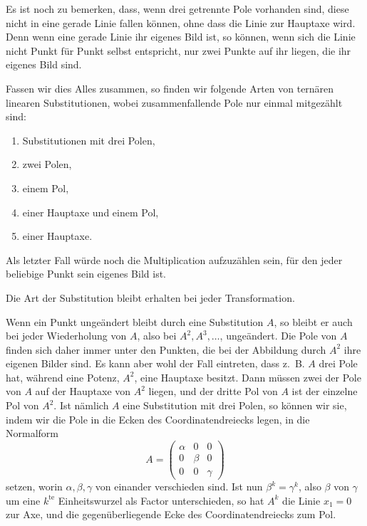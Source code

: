 \documentclass[12pt,a4paper]{article}
\begin{document}
Es ist noch zu bemerken, dass, wenn drei getrennte Pole vorhanden sind, diese nicht in eine gerade Linie fallen k\"onnen, ohne dass die Linie zur Hauptaxe wird. Denn wenn eine gerade Linie ihr eigenes Bild ist, so k\"onnen, wenn sich die Linie nicht Punkt f\"ur Punkt selbst entspricht, nur zwei Punkte auf ihr liegen, die ihr eigenes Bild sind.

Fassen wir dies Alles zusammen, so finden wir folgende Arten von tern\"aren linearen Substitutionen, wobei zusammenfallende Pole nur einmal mitgez\"ahlt sind:
\begin{enumerate}[label=\arabic*.]
\item Substitutionen mit drei Polen,
\item \phantom{Substitutionen mit} zwei Polen,
\item \phantom{Substitutionen mit} einem Pol,
\item \phantom{Substitutionen mit} einer Hauptaxe und einem Pol,
\item \phantom{Substitutionen mit} einer Hauptaxe.
\end{enumerate}

Als letzter Fall w\"urde noch die Multiplication aufzuz\"ahlen sein, f\"ur den jeder beliebige Punkt sein eigenes Bild ist.

Die Art der Substitution bleibt erhalten bei jeder Transformation.

Wenn ein Punkt unge\"andert bleibt durch eine Substitution $A$, so bleibt er auch bei jeder Wiederholung von $A$, also bei $A^2, A^3, \ldots$, unge\"andert. Die Pole von $A$ finden sich daher immer unter den Punkten, die bei der Abbildung durch $A^2$ ihre eigenen Bilder sind. Es kann aber wohl der Fall eintreten, dass z.~B. $A$ drei Pole hat, w\"ahrend eine Potenz, $A^2$, eine Hauptaxe besitzt. Dann m\"ussen zwei der Pole von $A$ auf der Hauptaxe von $A^2$ liegen, und der dritte Pol von $A$ ist der einzelne Pol von $A^2$. Ist n\"amlich $A$ eine Substitution mit drei Polen, so k\"onnen wir sie, indem wir die Pole in die Ecken des Coordinatendreiecks legen, in die Normalform
\[ A = \begin{pmatrix} \alpha & 0 & 0 \\ 0 & \beta & 0 \\ 0 & 0 & \gamma \end{pmatrix} \]
setzen, worin $\alpha, \beta, \gamma$ von einander verschieden sind. Ist nun $\beta^k = \gamma^k$, also $\beta$ von $\gamma$ um eine $k^{\text{te}}$ Einheitswurzel als Factor unterschieden, so hat $A^k$ die Linie $x_1 = 0$ zur Axe, und die gegen\"uberliegende Ecke des Coordinatendreiecks zum Pol.
\end{document}
